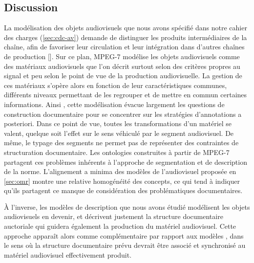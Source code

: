 \subsection*{Discussion}
La modélisation des objets audiovisuels que nous avons spécifié dans notre cahier des charges (\ref{sec:cdc-av}) demande de distinguer les produits intermédiaires de la chaîne, afin de favoriser leur circulation et leur intégration dans d'autres chaînes de production [].
Sur ce plan, MPEG-7 modélise les objets audiovisuels comme des matériaux audiovisuels que l'on décrit surtout selon des critères propres au signal et peu selon le point de vue de la production audiovisuelle.
La gestion de ces matériaux s'opère alors en fonction de leur caractéristiques communes, différents niveaux permettant de les regrouper et de mettre en commun certaines informations. 
Ainsi , cette modélisation évacue largement les questions de construction documentaire pour se concentrer sur les stratégies d'annotations a posteriori.
Dans ce point de vue, toutes les transformations d'un matériel se valent, quelque soit l'effet sur le sens véhiculé par le segment audiovisuel. 
De même, le typage des segments ne permet pas de représenter des contraintes de structuration documentaire.
Les ontologies construites à partir de MPEG-7 partagent ces problèmes inhérents à l'approche de segmentation et de description de la norme.
L'alignement a minima des modèles de l'audiovisuel proposée en \ref{sec:omr} montre une relative homogénéité des concepts, ce qui tend à indiquer qu'ils partagent  ce manque de considération des problématiques documentaires. 

À l'inverse, les modèles de description  que nous avons étudié modélisent les objets audiovisuels en devenir, et décrivent justement la structure documentaire auctoriale qui guidera également la production du matériel audiovisuel.
Cette approche apparaît alors comme complémentaire par rapport aux modèles , dans le sens où la structure documentaire prévu devrait être associé et synchronisé au matériel audiovisuel effectivement produit.\\


